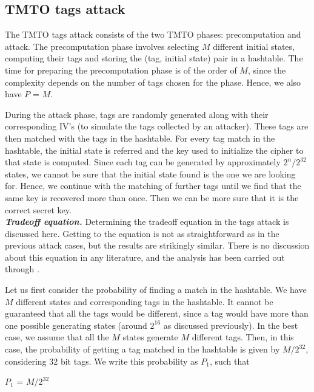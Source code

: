 \subsection{TMTO tags attack}

The TMTO tags attack consists of the two TMTO phases: precomputation and attack. The precomputation phase involves selecting $M$ different initial states, computing their tags and storing the (tag, initial state) pair in a hashtable. The time for preparing the precomputation phase is of the order of $M$, since the complexity depends on the number of tags chosen for the phase. Hence, we also have $P$ = $M$.

During the attack phase, tags are randomly generated along with their corresponding IV's (to simulate the tags collected by an attacker). These tags are then matched with the tags in the hashtable. For every tag match in the hashtable, the initial state is referred and the key used to initialize the cipher to that state is computed. Since each tag can be generated by approximately $2^n/2^{32}$ states, we cannot be sure that the initial state found is the one we are looking for. Hence, we continue with the matching of further tags until we find that the same key is recovered more than once. Then we can be more sure that it is the correct secret key.\\

\noindent \textit{\textbf{Tradeoff equation.}} Determining the tradeoff equation in the tags attack is discussed here. Getting to the equation is not as straightforward as in the previous attack cases, but the results are strikingly similar. There is no discussion about this equation in any literature, and the analysis has been carried out through \cite{erik-discussions}.

Let us first consider the probability of finding a match in the hashtable. We have $M$ different states and corresponding tags in the hashtable. It cannot be guaranteed that all the tags would be different, since a tag would have more than one possible generating states (around $2^{16}$ as discussed previously). In the best case, we assume that all the $M$ states generate $M$ different tags. Then, in this case, the probability of getting a tag matched in the hashtable is given by $M/2^{32}$, considering 32 bit tags. We write this probability as $P_1$, such that

\begin{center}
$P_1$ = $M/2^{32}$
\end{center}

